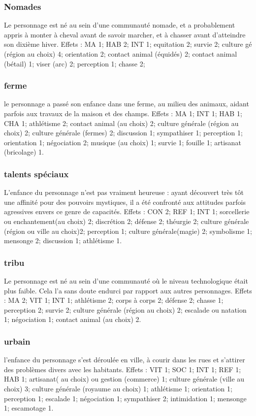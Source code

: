 \documentclass[10pt,a4paper,twocolumn]{book}
\begin{document}
\subsubsection{Nomades}
Le personnage est né au sein d’une communauté nomade, et a probablement appris à monter à cheval avant de savoir marcher, et à chasser avant d’atteindre son dixième hiver.
Effets : MA 1; HAB 2; INT 1; equitation 2; survie 2; culture gé (région au choix) 4; orientation 2; contact animal (équidés) 2; contact animal (bétail) 1; viser (arc) 2; perception 1; chasse 2;
\subsubsection{ferme}
le personnage a passé son enfance dans une ferme, au milieu des animaux, aidant parfois aux travaux de la maison et des champs.
Effets : MA 1; INT 1; HAB 1; CHA 1; athlétisme 2; contact animal (au choix) 2;  culture générale (région au choix) 2; culture générale (fermes) 2; discussion 1; sympathiser 1; perception 1; orientation 1; négociation 2; musique (au choix) 1; survie 1; fouille 1; artisanat (bricolage) 1.
\subsubsection{talents spéciaux}
L’enfance du personnage n’est pas vraiment heureuse : ayant découvert très tôt une affinité pour des pouvoirs mystiques, il a été confronté aux attitudes parfois agressives envers ce genre de capacités.
Effets : CON 2; REF 1; INT 1; sorcellerie ou enchantement(au choix) 2; discrétion 2; défense 2; théurgie 2; culture générale (région ou ville au choix)2; perception 1; culture générale(magie) 2; symbolisme 1; mensonge 2; discussion 1; athlétisme 1.
\subsubsection{tribu}
Le personnage est né au sein d’une communauté où le niveau technologique était plus faible. Cela l’a sans doute endurci par rapport aux autres personnages.
Effets : MA 2; VIT 1; INT 1; athlétisme 2; corps à corps 2; défense 2; chasse 1; perception 2; survie 2; culture générale (région au choix) 2; escalade ou natation 1; négociation 1; contact animal (au choix) 2.
\subsubsection{urbain}
l’enfance du personnage s’est déroulée en ville, à courir dans les rues et s’attirer des problèmes divers avec les habitants.
Effets : VIT 1; SOC 1; INT 1; REF 1; HAB 1; artisanat( au choix) ou gestion (commerce) 1; culture générale (ville au choix) 3; culture générale (royaume au choix) 1; athlétisme 1; orientation 1; perception 1; escalade 1; négociation 1; sympathiser 2; intimidation 1; mensonge 1; escamotage 1.
\end{document}
